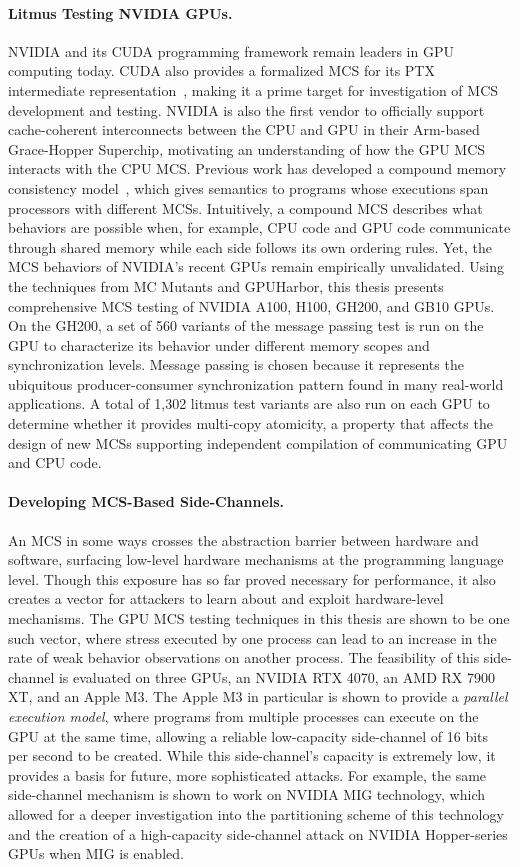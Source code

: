 \paragraph{Litmus Testing NVIDIA GPUs.} NVIDIA and its CUDA programming framework remain leaders in GPU computing today. CUDA also provides a formalized MCS for its PTX intermediate representation~\cite{lustig2019ptx}, making it a prime target for investigation of MCS development and testing. NVIDIA is also the first vendor to officially support cache-coherent interconnects between the CPU and GPU in their Arm-based Grace-Hopper Superchip, motivating an understanding of how the GPU MCS interacts with the CPU MCS. Previous work has developed a compound memory consistency model~\cite{goens2023compound}, which gives semantics to programs whose executions span processors with different MCSs. Intuitively, a compound MCS describes what behaviors are possible when, for example, CPU code and GPU code communicate through shared memory while each side follows its own ordering rules. Yet, the MCS behaviors of NVIDIA's recent GPUs remain empirically unvalidated. Using the techniques from MC Mutants and GPUHarbor, this thesis presents comprehensive MCS testing of NVIDIA A100, H100, GH200, and GB10 GPUs. On the GH200, a set of 560 variants of the message passing test is run on the GPU to characterize its behavior under different memory scopes and synchronization levels. Message passing is chosen because it represents the ubiquitous producer-consumer synchronization pattern found in many real-world applications. A total of 1,302 litmus test variants are also run on each GPU to determine whether it provides multi-copy atomicity, a property that affects the design of new MCSs supporting independent compilation of communicating GPU and CPU code.

\paragraph{Developing MCS-Based Side-Channels.} An MCS in some ways crosses the abstraction barrier between hardware and software, surfacing low-level hardware mechanisms at the programming language level. Though this exposure has so far proved necessary for performance, it also creates a vector for attackers to learn about and exploit hardware-level mechanisms. The GPU MCS testing techniques in this thesis are shown to be one such vector, where stress executed by one process can lead to an increase in the rate of weak behavior observations on another process. The feasibility of this side-channel is evaluated on three GPUs, an NVIDIA RTX 4070, an AMD RX 7900 XT, and an Apple M3. The Apple M3 in particular is shown to provide a \textit{parallel execution model}, where programs from multiple processes can execute on the GPU at the same time, allowing a reliable low-capacity side-channel of 16 bits per second to be created. While this side-channel's capacity is extremely low, it provides a basis for future, more sophisticated attacks. For example, the same side-channel mechanism is shown to work on NVIDIA MIG technology, which allowed for a deeper investigation into the partitioning scheme of this technology and the creation of a high-capacity side-channel attack on NVIDIA Hopper-series GPUs when MIG is enabled.

